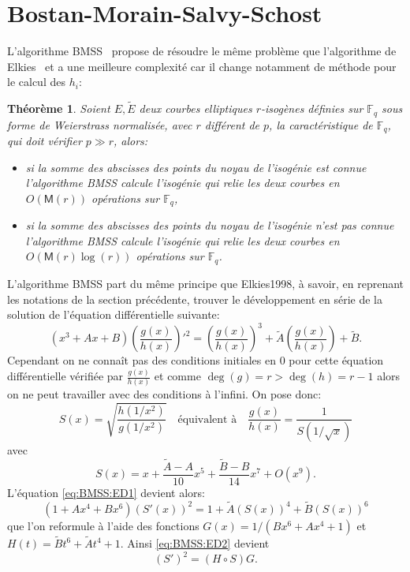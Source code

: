 \documentclass[10pt,a4paper]{book}
\theoremstyle{plain}
\newtheorem{thm}{Théorème}[chapter]
\theoremstyle{definition}
\theoremstyle{definition}
\theoremstyle{definition}
\theoremstyle{definition}
\theoremstyle{definition}
\theoremstyle{remark}
\theoremstyle{remark}
\theoremstyle{definition}
\begin{document}
\section{Bostan-Morain-Salvy-Schost}
L'algorithme BMSS~\cite{BMSS08} propose de résoudre le même problème que 
l'algorithme de Elkies~\cite{Elkies1998} et a une meilleure complexité car 
il change notamment de méthode pour le calcul des $h_i$:
\begin{thm}
\label{thm:BMSS}
Soient $E, \tilde{E}$ deux courbes elliptiques $r$-isogènes définies sur 
$\mathbb{F}_q$ sous forme de Weierstrass normalisée, avec $r$ différent de 
$p$, la caractéristique de $\mathbb{F}_q$, qui doit vérifier 
$p \gg r$, alors:
\begin{itemize}
\item  si la somme des abscisses des points du noyau de l'isogénie est connue 
l'algorithme BMSS  calcule l'isogénie qui relie les deux courbes en 
$O(\mathsf{M}(r))$ opérations sur $\mathbb{F}_q$,
\item si la somme des abscisses des points du noyau de l'isogénie n'est pas 
connue l'algorithme BMSS calcule l'isogénie qui relie les 
deux courbes en $O(\mathsf{M}(r)\log(r))$ opérations sur $\mathbb{F}_q$.
\end{itemize}
\end{thm}

L'algorithme BMSS part du même principe que Elkies1998, à savoir, en reprenant 
les notations de la section précédente, trouver le développement en série de la
solution de l'équation différentielle suivante:   
\begin{equation}
\label{eq:BMSS:ED1}
(x^3+Ax+B)\left(\frac{g(x)}{h(x)} \right)'^2=  \left(\frac{g(x)}{h(x)} \right)^3 + \tilde{A} \left(\frac{g(x)}{h(x)} \right) + \tilde{B}.
\end{equation}
Cependant on ne connaît pas des conditions initiales en $0$ pour cette équation
différentielle vérifiée par $\frac{g(x)}{h(x)}$ et comme $\deg(g)=r> \deg(h)= 
r-1$ alors on ne peut travailler avec des conditions à l'infini. On pose donc:
\begin{equation}
S(x)=\sqrt{\frac{h(1/x^2)}{g(1/x^2)}} \quad \text{équivalent à} \quad \frac{g(x)}{h(x)}=\frac{1}{S(1/\sqrt{x})}
\end{equation} 
avec 
\begin{equation}
S(x)=x + \frac{\tilde{A}-A}{10}x^5+\frac{\tilde{B}-B}{14}x^7+O(x^9).
\end{equation}
L'équation \eqref{eq:BMSS:ED1} devient alors:
\begin{equation}
\label{eq:BMSS:ED2}
(1+Ax^4+Bx^6)(S'(x))^2=1+\tilde{A}(S(x))^4+\tilde{B}(S(x))^6
\end{equation}
que l'on reformule à l'aide des fonctions $G(x)=1/(Bx^6+Ax^4+1)$ et $H(t)=\tilde{B}t^6+\tilde{A}t^4+1$. Ainsi \eqref{eq:BMSS:ED2} devient 
\begin{equation}
\label{eq:BMSS:ED3}
(S')^2=(H \circ S) G.
\end{equation}
\end{document}
